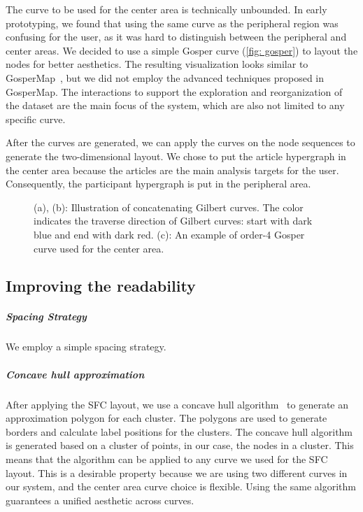 The curve to be used for the center area is technically unbounded. 
In early prototyping, we found that using the same curve as the peripheral region was confusing for the user, as it was hard to distinguish between the peripheral and center areas.
We decided to use a simple Gosper curve (\autoref{fig: gosper}) to layout the nodes for better aesthetics.
The resulting visualization looks similar to GosperMap~\cite{auber2013gospermap}, but we did not employ the advanced techniques proposed in GosperMap.
The interactions to support the exploration and reorganization of the dataset are the main focus of the system, which are also not limited to any specific curve.

After the curves are generated, we can apply the curves on the node sequences to generate the two-dimensional layout.
We chose to put the article hypergraph in the center area because the articles are the main analysis targets for the user.
Consequently, the participant hypergraph is put in the peripheral area.
\begin{figure}%
    \centering
    \qquad
    \qquad
    \caption{
        (a), (b): Illustration of concatenating Gilbert curves. 
        The color indicates the traverse direction of Gilbert curves: start with dark blue and end with dark red.
        (c): An example of order-4 Gosper curve used for the center area.
    }%
    \label{fig: gilbert}%
\end{figure}

\subsection{Improving the readability}
\subparagraph{Spacing Strategy}
We employ a simple spacing strategy.

\subparagraph{Concave hull approximation}
After applying the SFC layout, we use a concave hull algorithm~\cite{park2012concavehull} to generate an approximation polygon for each cluster.
The polygons are used to generate borders and calculate label positions for the clusters.
The concave hull algorithm is generated based on a cluster of points, in our case, the nodes in a cluster.
This means that the algorithm can be applied to any curve we used for the SFC layout.
This is a desirable property because we are using two different curves in our system, and the center area curve choice is flexible.
Using the same algorithm guarantees a unified aesthetic across curves.

